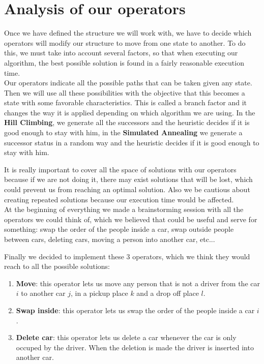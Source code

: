 \documentclass[12]{article}
\begin{document}
\section{Analysis of our operators}

Once we have defined the structure we will work with, we have to decide which operators will modify our structure to move from one  state to another. To do this, we must take into account several factors, so that when executing our algorithm, the best possible solution is found in a fairly reasonable execution time. 
\\
Our operators indicate all the possible paths that can be taken given any state. Then we will use all these possibilities with the objective that this becomes a state with some favorable characteristics. This is called a branch factor and it changes the way it is applied depending on which algorithm we are using. In the \textbf{Hill Climbing}, we generate all the successors and the heuristic decides if it is good enough to stay with him, in the \textbf{Simulated Annealing} we generate a successor status in a random way and the heuristic decides if it is good enough to stay with him. 
\\
\medskip

It is really important to cover all the space of solutions with our operators because if we are not doing it, there may exist solutions that will be lost, which could prevent us from reaching an optimal solution. Also we be cautious about creating repeated solutions because our execution time would be affected. 
\\

At the beginning of everything we made a brainstorming session with all the operators we could think of, which we believed that could be useful and serve for something: swap the order of the people inside a car, swap outside people between cars, deleting cars, moving a person into another car, etc...

Finally we decided to implement these 3 operators, which we think they would reach to all the possible solutions:

\begin{enumerate}
\item \textbf{Move}: this operator lets us move any person that is not a driver from the car $i$ to another car $j$, in a pickup place $k$ and a drop off place $l$.  
\item \textbf{Swap inside}: this operator lets us swap the order of the people inside a car $i$.
\item \textbf{Delete car}: this operator lets us delete a car whenever the car is only occuped by the driver. When the deletion is made the driver is inserted into another car. 
\end{enumerate}
\end{document}
